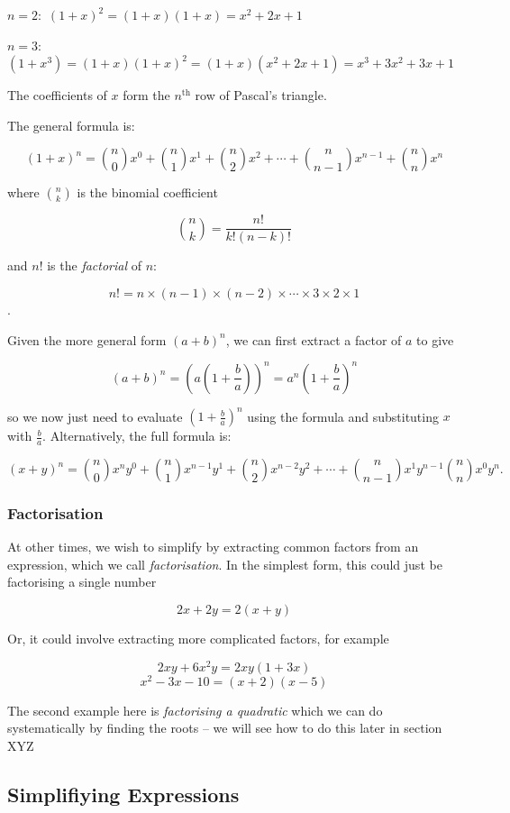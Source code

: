 \documentclass[
]{book}
\theoremstyle{definition}
\theoremstyle{definition}
\theoremstyle{definition}
\theoremstyle{definition}
\theoremstyle{remark}
\begin{document}
\(n=2:\) \((1+x)^2=(1+x)(1+x)=x^2+2x+1\)

\(n=3:\) \((1+x^3)=(1+x)(1+x)^2=(1+x)(x^2+2x+1)=x^3+3x^2+3x+1\)

The coefficients of \(x\) form the \(n^\text{th}\) row of Pascal's triangle.

The general formula is:

\[(1+x)^n = \binom{n}{0}x^0+\binom{n}{1}x^1+\binom{n}{2}x^2+\dotsb+\binom{n}{n-1}x^{n-1}+\binom{n}{n}x^n\]

where \(\binom{n}{k}\) is the binomial coefficient

\[\binom{n}{k}=\frac{n!}{k!(n-k)!}\]

and \(n!\) is the \emph{factorial} of \(n\):

\[n!=n\times(n-1)\times(n-2)\times\dotsb \times3\times 2\times 1\].

Given the more general form \((a+b)^n\), we can first extract a factor of \(a\) to give

\[(a+b)^n=(a(1+\frac{b}{a}))^n=a^n(1+\frac{b}{a})^n\]

so we now just need to evaluate \((1+\frac{b}{a})^n\) using the formula and substituting \(x\) with \(\frac{b}{a}\). Alternatively, the full formula is:

\[(x+y)^n = \binom{n}{0}x^ny^0+\binom{n}{1}x^{n-1}y^1+\binom{n}{2}x^{n-2}y^2+\dotsb+\binom{n}{n-1}x^1y^{n-1}\binom{n}{n}x^0y^n.\]

\hypertarget{factorisation}{%
\subsubsection{Factorisation}\label{factorisation}}

At other times, we wish to simplify by extracting common factors from an expression, which we call \emph{factorisation}. In the simplest form, this could just be factorising a single number

\[2x+2y=2(x+y)\]

Or, it could involve extracting more complicated factors, for example

\[2xy+6x^2y=2xy(1+3x)\]
\[x^2-3x-10=(x+2)(x-5)\]

The second example here is \emph{factorising a quadratic} which we can do systematically by finding the roots -- we will see how to do this later in section XYZ

\hypertarget{simplifiying-expressions}{%
\subsection{Simplifiying Expressions}\label{simplifiying-expressions}}
\end{document}
